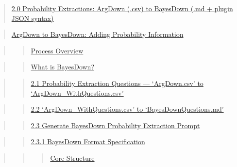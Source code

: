\documentclass[
  11pt,
  letterpaper,
]{book}
\begin{document}
\begin{quote}
\hyperref[scrollTo=7SGB0XMp5VFq]{2.0 Probability Extractions: ArgDown
(.csv) to BayesDown (.md + plugin JSON syntax)}
\end{quote}

\begin{quote}
\hyperref[scrollTo=hWkmySZYNtzS]{ArgDown to BayesDown: Adding
Probability Information}
\end{quote}

\begin{quote}
\begin{quote}
\hyperref[scrollTo=hWkmySZYNtzS]{Process Overview}
\end{quote}
\end{quote}

\begin{quote}
\begin{quote}
\hyperref[scrollTo=hWkmySZYNtzS]{What is BayesDown?}
\end{quote}
\end{quote}

\begin{quote}
\begin{quote}
\hyperref[scrollTo=WcF2nHXBZru4]{2.1 Probability Extraction Questions
--- `ArgDown.csv' to `ArgDown\_WithQuestions.csv'}
\end{quote}
\end{quote}

\begin{quote}
\begin{quote}
\hyperref[scrollTo=-q9UOQ8yaBZn]{2.2 `ArgDown\_WithQuestions.csv' to
`BayesDownQuestions.md'}
\end{quote}
\end{quote}

\begin{quote}
\begin{quote}
\hyperref[scrollTo=Ux4OUCPue6Bu]{2.3 Generate BayesDown Probability
Extraction Prompt}
\end{quote}
\end{quote}

\begin{quote}
\begin{quote}
\hyperref[scrollTo=ivcnd2ml41Nv]{2.3.1 BayesDown Format Specification}
\end{quote}
\end{quote}

\begin{quote}
\begin{quote}
\begin{quote}
\hyperref[scrollTo=ivcnd2ml41Nv]{Core Structure}
\end{quote}
\end{quote}
\end{quote}
\end{document}
